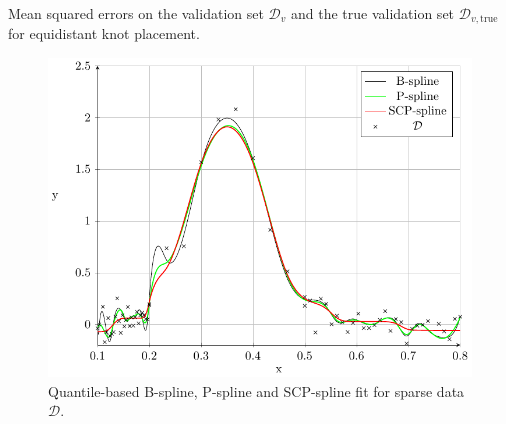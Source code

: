 \begin{table}[H]
	\begin{center}
	\end{center}
	\caption{Mean squared errors on the validation set $\mathcal{D}_v$ and the true validation set $\mathcal{D}_{v,\mathrm{true}}$ for equidistant knot placement.}
	\label{tab:sparse-example-equidistant}
\end{table}


\begin{figure}[H]
	\centering
	\includegraphics{graphics/pgfplots/cha4/exp-sparse-quantile.pdf}
	\caption{Quantile-based B-spline, P-spline and SCP-spline fit for sparse data $\mathcal{D}$.}
	\label{fig:sparse-example-quantile}
\end{figure}

